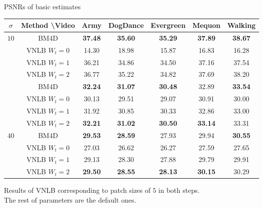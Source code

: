 \documentclass[mathserif, 8pt]{beamer}
\makeatletter
\newcounter{multipleslide}
\newcommand{\multipleframe}{%
\setcounter{multipleslide}{\value{framenumber}}
\stepcounter{multipleslide}
\patchcmd{\beamer@@tmpl@footline}%
	{\insertframenumber}%
	{\themultipleslide}%
	{}%
	{}%
}
\newcommand{\best}[1]{\textbf{\textcolor{MyOrange}{#1}}}
\makeatother
\begin{document}
\multipleframe
\begin{frame}{PSNRs of basic estimates}


	\begin{center}
	\begin{tabular}{| c | c |c c c c c|}
		\hline \hline
		$\sigma$  & Method \textbackslash Video & Army & DogDance & Evergreen & Mequon & Walking \\\hline\hline
		\multirow{5}{*}{$10$} & BM4D           & \best{37.48} & \best{35.60} & \best{35.29} & \best{37.89} & \best{38.67} \\%
		                      & VNLB $W_t = 0$ &       14.30  &       18.98  &       15.87  &       16.83  &       16.28  \\%
		                      & VNLB $W_t = 1$ &       36.21  &       34.86  &       34.50  &       37.16  &       37.54  \\%
		                      & VNLB $W_t = 2$ &       36.77  &       35.22  &       34.82  &       37.69  &       38.20  \\\hline
%									 
		\multirow{5}{*}{$25$} & BM4D           & \best{32.24} & \best{31.07} & \best{30.48} &       32.89  & \best{33.54} \\%
		                      & VNLB $W_t = 0$ &       30.13  &       29.51  &       29.07  &       30.91  &       30.00  \\%
		                      & VNLB $W_t = 1$ &       31.92  &       30.85  &       30.33  &       32.86  &       33.00  \\%
									 & VNLB $W_t = 2$ & \best{32.21} & \best{31.02} & \best{30.50} & \best{33.14} &       33.31  \\\hline
%									 
		\multirow{5}{*}{$40$} & BM4D           & \best{29.53} & \best{28.59} &       27.93  &       29.94  & \best{30.55} \\%
		                      & VNLB $W_t = 0$ &       27.03  &       26.62  &       26.27  &       27.59  &       27.65  \\%
		                      & VNLB $W_t = 1$ &       29.13  &       28.30  &       27.88  &       29.79  &       29.91  \\%
									 & VNLB $W_t = 2$ & \best{29.50} & \best{28.55} & \best{28.13} & \best{30.15} &       30.29  \\\hline\hline
	\end{tabular}

	\bigskip
	Results of VNLB corresponding to patch sizes of $5$ in both steps.\\The rest of parameters are the default ones.
	\end{center}

\end{frame}
\end{document}
